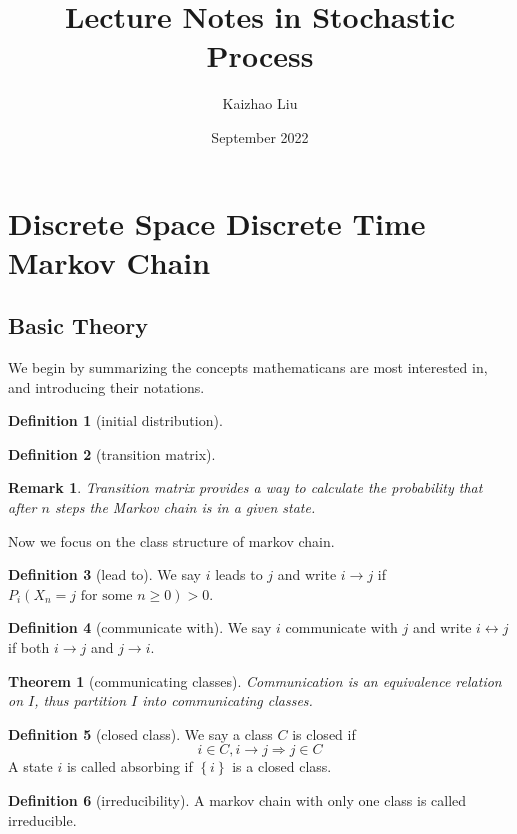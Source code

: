 \documentclass{article}
\title{Lecture Notes in Stochastic Process}
\author{Kaizhao Liu}
\date{September 2022}
\newtheorem{Thm}{Theorem}[section]
\newtheorem*{Rk}{Remark}
\theoremstyle{definition}
\newtheorem{Def}{Definition}[section]
\renewcommand{\geq}{\geqslant}
\newcommand{\<}{\left\langle}
\renewcommand{\>}{\right\rangle}
\begin{document}
\maketitle
\tableofcontents
\section{Discrete Space Discrete Time Markov Chain}
\subsection{Basic Theory}
We begin by summarizing the concepts mathematicans are most interested in, and introducing their notations. 
\begin{Def}[initial distribution]
    
\end{Def}

\begin{Def}[transition matrix]
    
\end{Def}
\begin{Rk}
Transition matrix provides a way to calculate the probability that after $n$ steps the Markov chain is in a given state.
\end{Rk}
Now we focus on the class structure of markov chain.
\begin{Def}[lead to]
    We say $i$ leads to $j$ and write $i\to j$ if $P_i(X_n=j\text{ for some }n\geq 0)>0$.
\end{Def}
\begin{Def}[communicate with]
    We say $i$ communicate with $j$ and write $i\leftrightarrow j$ if both $i\to j$ and $j\to i$.
\end{Def}
\begin{Thm}[communicating classes]
    Communication is an equivalence relation on $I$, thus partition $I$ into communicating classes.
\end{Thm}
\begin{Def}[closed class]
    We say a class $C$ is closed if \[i\in C,i\to j\Longrightarrow j\in C\]
    A state $i$ is called absorbing if $\left\{i\right\}$ is a closed class.
\end{Def}
\begin{Def}[irreducibility]
    A markov chain with only one class is called irreducible.
\end{Def}
\end{document}
